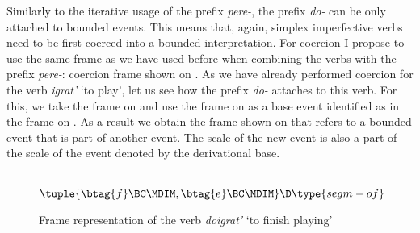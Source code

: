 Similarly to the iterative usage of the prefix \textit{pere-}, the prefix \textit{do-} can be only attached to bounded events. This means that, again, simplex imperfective verbs need to be first coerced into a bounded interpretation. For coercion I propose to use the same frame as we have used before when combining the verbs with the prefix \textit{pere-}: coercion frame shown on . As we have already performed coercion for the verb \textit{igrat'} `to play', let us see how the prefix \textit{do-} attaches to this verb. For this, we take the frame on  and use the frame on  as a base event identified as  in the frame on . As a result we obtain the frame shown on  that refers to a bounded event that is part of another event. The scale of the new event is also a part of the scale of the event denoted by the derivational base. 

\begin{figure}\small
 \begin{minipage}{0.45\textwidth}
 \end{minipage}\hfill%
  \begin{minipage}{0.45\textwidth}\centering
 \\
$\tuple{\btag{f}\BC\MDIM,\btag{e}\BC\MDIM}\D\type{segm-of}$\\[1ex]
\end{minipage}
\caption{Frame representation of the verb \textit{doigrat'} `to finish playing' \label{frame:do:igrat}}
\end{figure}


